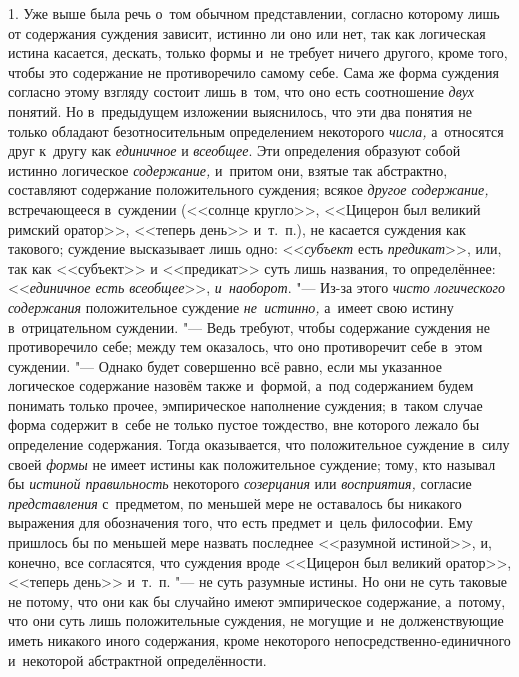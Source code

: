 
1. Уже выше была речь о~том обычном представлении, согласно
которому лишь от содержания суждения зависит, истинно ли оно или нет, так
как логическая истина касается, дескать, только формы и~не требует ничего
другого, кроме того, чтобы это содержание не противоречило самому себе.
Сама же форма суждения согласно этому взгляду состоит лишь в~том, что оно
есть соотношение {\em двух} понятий. Но в~предыдущем изложении выяснилось, что
эти два понятия не только обладают безотносительным определением некоторого
{\em числа,} а~относятся друг к~другу как {\em единичное} и {\em всеобщее}.
Эти определения образуют собой истинно логическое {\em содержание,} и~притом
они, взятые так абстрактно, составляют содержание положительного суждения;
всякое {\em другое содержание,} встречающееся в~суждении (<<солнце кругло>>,
<<Цицерон был великий римский оратор>>, <<теперь день>> и~т.~п.), не касается
суждения как такового; суждение высказывает лишь одно: <<{\em субъект} есть
{\em предикат}>>, или, так как <<субъект>> и <<предикат>> суть лишь названия,
то определённее: <<{\em единичное есть всеобщее}>>, {\em и~наоборот}. "---
Из-за этого {\em чисто логического содержания} положительное суждение
{\em не~истинно,} а~имеет свою истину в~отрицательном суждении. "--- Ведь
требуют, чтобы содержание суждения не противоречило себе; между тем оказалось,
что оно противоречит себе в~этом суждении. "--- Однако будет совершенно
всё равно, если мы указанное логическое содержание назовём также и~формой,
а~под содержанием будем понимать только прочее, эмпирическое наполнение
суждения; в~таком случае форма содержит в~себе не только пустое тождество,
вне которого лежало бы определение содержания. Тогда оказывается, что
положительное суждение в~силу своей {\em формы} не имеет
истины как положительное суждение; тому, кто называл бы
{\em истиной правильность} некоторого {\em созерцания} или
{\em восприятия,} согласие {\em представления} с~предметом,
по меньшей мере не оставалось бы никакого выражения для
обозначения того, что есть предмет и~цель философии. Ему пришлось бы по
меньшей мере назвать последнее <<разумной истиной>>, и, конечно, все
согласятся, что суждения вроде <<Цицерон был великий оратор>>, <<теперь день>>
и~т.~п. "--- не суть разумные истины. Но они не суть таковые не
потому, что они как бы случайно имеют эмпирическое содержание, а~потому,
что они суть лишь положительные суждения, не могущие и~не долженствующие
иметь никакого иного содержания, кроме некоторого
непосредственно-единичного и~некоторой абстрактной определённости.

